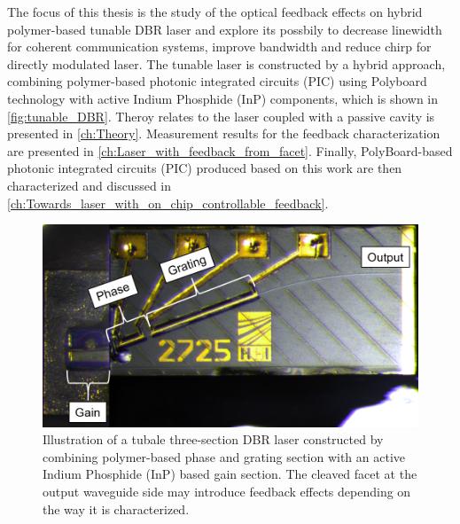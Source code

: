 The focus of this thesis is the study of the optical feedback effects on hybrid polymer-based tunable DBR laser and explore its possbily to decrease linewidth for coherent communication systems, improve bandwidth and reduce chirp for directly modulated laser. 
The tunable laser is constructed by a hybrid approach, combining polymer-based photonic integrated circuits (PIC) using Polyboard technology \cite{zhang2011polymer} with active Indium Phosphide (InP) components, which is shown in \autoref{fig:tunable_DBR}. 
Theroy relates to the laser coupled with a passive cavity is presented in \autoref{ch:Theory}. Measurement results for the feedback characterization are presented in \autoref{ch:Laser_with_feedback_from_facet}. 
Finally, PolyBoard-based photonic integrated circuits (PIC) produced based on this work are then characterized and discussed in \autoref{ch:Towards_laser_with_on_chip_controllable_feedback}.

\begin{figure}[ht]
    \centering
    \includegraphics[width=.9\linewidth]{figures/tunable_DBR.png}
    \caption{Illustration of a tubale three-section DBR laser constructed by combining polymer-based phase and grating section with an active Indium Phosphide (InP) based gain section. The cleaved facet at the output waveguide side may introduce feedback effects depending on the way it is characterized.}
    \label{fig:tunable_DBR}
\end{figure}